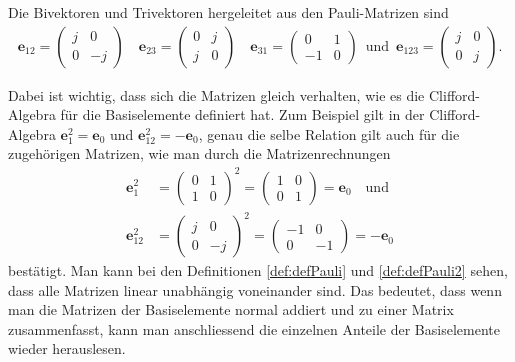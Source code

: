 \begin{definition} \label{def:defPauli2} 
	Die Bivektoren und Trivektoren hergeleitet aus den Pauli-Matrizen sind
	\begin{align} \label{Pauli2}
	\mathbf{e}_{12} =  
	\begin{pmatrix}
	j & 0 \\
	0 & -j
	\end{pmatrix}\quad
	\mathbf{e}_{23} =
	\begin{pmatrix}
	0 & j \\
	j & 0
	\end{pmatrix}\quad
	\mathbf{e}_{31} =
	\begin{pmatrix}
	0 & 1 \\
	-1 & 0
	\end{pmatrix}\enspace\text{und}\enspace
	\mathbf{e}_{123} =
	\begin{pmatrix}
	j & 0 \\
	0 & j
	\end{pmatrix}.
	\end{align}
\end{definition}
Dabei ist wichtig, dass sich die Matrizen gleich verhalten, wie es die Clifford-Algebra für die Basiselemente definiert hat. Zum Beispiel gilt in der Clifford-Algebra $\mathbf{e}_1^2=\mathbf{e}_0$ und $\mathbf{e}_{12}^2=-\mathbf{e}_0$, genau die selbe Relation gilt auch für die zugehörigen Matrizen, wie man durch die Matrizenrechnungen
\begin{align}
\mathbf{e}_1^2 &=
\begin{pmatrix}
0 & 1 \\
1 & 0
\end{pmatrix}^2 = 
\begin{pmatrix}
1 & 0 \\
0 & 1
\end{pmatrix}= \mathbf{e}_0 \quad\text{und}\\
\mathbf{e}_{12}^2 &=
\begin{pmatrix}
j & 0 \\
0 & -j
\end{pmatrix}^2 = 
\begin{pmatrix}
-1 & 0 \\
0 & -1
\end{pmatrix} = -\mathbf{e}_0 
\end{align}
bestätigt. Man kann bei den Definitionen \ref{def:defPauli} und \ref{def:defPauli2} sehen, dass alle Matrizen linear unabhängig voneinander sind. Das bedeutet, dass wenn man die Matrizen der Basiselemente normal addiert und zu einer Matrix zusammenfasst, kann man anschliessend die einzelnen Anteile der Basiselemente wieder herauslesen.
